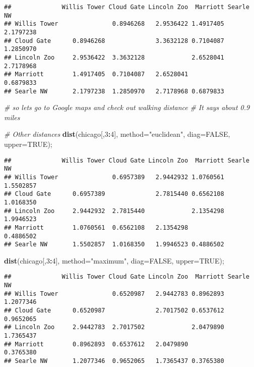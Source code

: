 \documentclass[
]{article}
\newenvironment{Shaded}{\begin{snugshade}}{\end{snugshade}}
\newcommand{\CommentTok}[1]{\textcolor[rgb]{0.56,0.35,0.01}{\textit{#1}}}
\newcommand{\DataTypeTok}[1]{\textcolor[rgb]{0.13,0.29,0.53}{#1}}
\newcommand{\DecValTok}[1]{\textcolor[rgb]{0.00,0.00,0.81}{#1}}
\newcommand{\KeywordTok}[1]{\textcolor[rgb]{0.13,0.29,0.53}{\textbf{#1}}}
\newcommand{\NormalTok}[1]{#1}
\newcommand{\OperatorTok}[1]{\textcolor[rgb]{0.81,0.36,0.00}{\textbf{#1}}}
\newcommand{\OtherTok}[1]{\textcolor[rgb]{0.56,0.35,0.01}{#1}}
\newcommand{\StringTok}[1]{\textcolor[rgb]{0.31,0.60,0.02}{#1}}
\begin{document}
\begin{verbatim}
##              Willis Tower Cloud Gate Lincoln Zoo  Marriott Searle NW
## Willis Tower               0.8946268   2.9536422 1.4917405 2.1797238
## Cloud Gate      0.8946268              3.3632128 0.7104087 1.2850970
## Lincoln Zoo     2.9536422  3.3632128             2.6528041 2.7178968
## Marriott        1.4917405  0.7104087   2.6528041           0.6879833
## Searle NW       2.1797238  1.2850970   2.7178968 0.6879833
\end{verbatim}

\begin{Shaded}
\begin{Highlighting}[]
\CommentTok{\# so let\textquotesingle{}s go to Google maps and check out walking distance }
\CommentTok{\# It says about 0.9 miles}

\CommentTok{\# Other distances}
\KeywordTok{dist}\NormalTok{(chicago[,}\DecValTok{3}\OperatorTok{:}\DecValTok{4}\NormalTok{], }\DataTypeTok{method=}\StringTok{"euclidean"}\NormalTok{, }\DataTypeTok{diag=}\OtherTok{FALSE}\NormalTok{, }\DataTypeTok{upper=}\OtherTok{TRUE}\NormalTok{);}
\end{Highlighting}
\end{Shaded}

\begin{verbatim}
##              Willis Tower Cloud Gate Lincoln Zoo  Marriott Searle NW
## Willis Tower               0.6957389   2.9442932 1.0760561 1.5502857
## Cloud Gate      0.6957389              2.7815440 0.6562108 1.0168350
## Lincoln Zoo     2.9442932  2.7815440             2.1354298 1.9946523
## Marriott        1.0760561  0.6562108   2.1354298           0.4886502
## Searle NW       1.5502857  1.0168350   1.9946523 0.4886502
\end{verbatim}

\begin{Shaded}
\begin{Highlighting}[]
\KeywordTok{dist}\NormalTok{(chicago[,}\DecValTok{3}\OperatorTok{:}\DecValTok{4}\NormalTok{], }\DataTypeTok{method=}\StringTok{"maximum"}\NormalTok{, }\DataTypeTok{diag=}\OtherTok{FALSE}\NormalTok{, }\DataTypeTok{upper=}\OtherTok{TRUE}\NormalTok{);}
\end{Highlighting}
\end{Shaded}

\begin{verbatim}
##              Willis Tower Cloud Gate Lincoln Zoo  Marriott Searle NW
## Willis Tower               0.6520987   2.9442783 0.8962893 1.2077346
## Cloud Gate      0.6520987              2.7017502 0.6537612 0.9652065
## Lincoln Zoo     2.9442783  2.7017502             2.0479890 1.7365437
## Marriott        0.8962893  0.6537612   2.0479890           0.3765380
## Searle NW       1.2077346  0.9652065   1.7365437 0.3765380
\end{verbatim}
\end{document}
